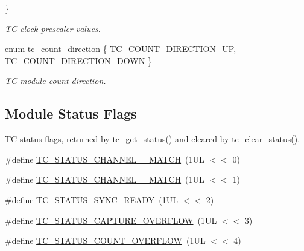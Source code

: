 \begin{DoxyCompactItemize}
 \}
\begin{DoxyCompactList}\small\item\em TC clock prescaler values. \end{DoxyCompactList}\item 
enum \mbox{\hyperlink{group__asfdoc__sam0__tc__group_ga28777c47943dfb2b5de0fd7ae14eac1f}{tc\+\_\+count\+\_\+direction}} \{ \mbox{\hyperlink{group__asfdoc__sam0__tc__group_gga28777c47943dfb2b5de0fd7ae14eac1faf247abdaef160b832fd09bc7597e8ca3}{T\+C\+\_\+\+C\+O\+U\+N\+T\+\_\+\+D\+I\+R\+E\+C\+T\+I\+O\+N\+\_\+\+UP}}, 
\mbox{\hyperlink{group__asfdoc__sam0__tc__group_gga28777c47943dfb2b5de0fd7ae14eac1fade3defd512c1bff05ce6302c2d96b014}{T\+C\+\_\+\+C\+O\+U\+N\+T\+\_\+\+D\+I\+R\+E\+C\+T\+I\+O\+N\+\_\+\+D\+O\+WN}}
 \}
\begin{DoxyCompactList}\small\item\em TC module count direction. \end{DoxyCompactList}\end{DoxyCompactItemize}
\subsection*{Module Status Flags}
\label{_amgrpdd98d5e8b9a5fd30d323c8eeeab117f4}%
TC status flags, returned by tc\+\_\+get\+\_\+status() and cleared by tc\+\_\+clear\+\_\+status(). \begin{DoxyCompactItemize}
\item 
\#define \mbox{\hyperlink{group__asfdoc__sam0__tc__group_gae74e90dac05478452203a41a88853286}{T\+C\+\_\+\+S\+T\+A\+T\+U\+S\+\_\+\+C\+H\+A\+N\+N\+E\+L\+\_\+\_\+\+M\+A\+T\+CH}}~(1\+U\+L $<$$<$ 0)
\item 
\#define \mbox{\hyperlink{group__asfdoc__sam0__tc__group_gaab140d8ac7858f45029fddf0fd3f4cf3}{T\+C\+\_\+\+S\+T\+A\+T\+U\+S\+\_\+\+C\+H\+A\+N\+N\+E\+L\+\_\+\_\+\+M\+A\+T\+CH}}~(1\+U\+L $<$$<$ 1)
\item 
\#define \mbox{\hyperlink{group__asfdoc__sam0__tc__group_ga73bfbe04c8834ec55242bcd0b678f94e}{T\+C\+\_\+\+S\+T\+A\+T\+U\+S\+\_\+\+S\+Y\+N\+C\+\_\+\+R\+E\+A\+DY}}~(1\+U\+L $<$$<$ 2)
\item 
\#define \mbox{\hyperlink{group__asfdoc__sam0__tc__group_gac13395d51cc03b5c43eda7654649925f}{T\+C\+\_\+\+S\+T\+A\+T\+U\+S\+\_\+\+C\+A\+P\+T\+U\+R\+E\+\_\+\+O\+V\+E\+R\+F\+L\+OW}}~(1\+U\+L $<$$<$ 3)
\item 
\#define \mbox{\hyperlink{group__asfdoc__sam0__tc__group_gada6e9a6bd144c0c2e360d1fdef944cdd}{T\+C\+\_\+\+S\+T\+A\+T\+U\+S\+\_\+\+C\+O\+U\+N\+T\+\_\+\+O\+V\+E\+R\+F\+L\+OW}}~(1\+U\+L $<$$<$ 4)
\end{DoxyCompactItemize}

